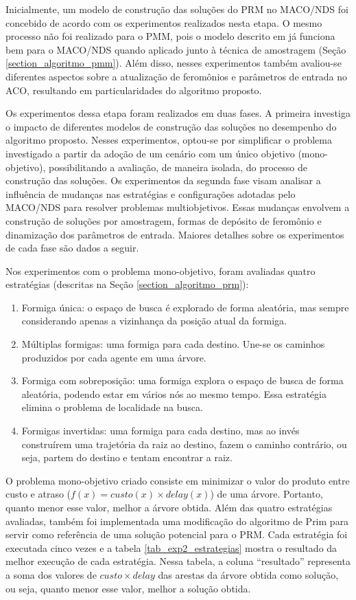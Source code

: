 Inicialmente, um modelo de construção das soluções do PRM no MACO/NDS foi concebido de acordo com os experimentos realizados nesta etapa. O mesmo processo não foi realizado para o PMM, pois o modelo descrito em \cite{Alaya2004} já funciona bem para o MACO/NDS quando aplicado junto à técnica de amostragem (Seção \ref{section_algoritmo_pmm}). Além disso, nesses experimentos também avaliou-se diferentes aspectos sobre a atualização de feromônios e parâmetros de entrada no ACO, resultando em particularidades do algoritmo proposto.

Os experimentos dessa etapa foram realizados em duas fases. A primeira investiga o impacto de diferentes modelos de construção das soluções no desempenho do algoritmo proposto. Nesses experimentos, optou-se por simplificar o problema investigado a partir da adoção de um cenário com um único objetivo (mono-objetivo), possibilitando a avaliação, de maneira isolada, do processo de construção das soluções. Os experimentos da segunda fase visam analisar a influência de mudanças nas estratégias e configurações adotadas pelo MACO/NDS para resolver problemas multiobjetivos. Essas mudanças envolvem a construção de soluções por amostragem, formas de depósito de feromônio e dinamização dos parâmetros de entrada. Maiores detalhes sobre os experimentos de cada fase são dados a seguir.

Nos experimentos com o problema mono-objetivo, foram avaliadas quatro estratégias (descritas na Seção \ref{section_algoritmo_prm}):

\begin{enumerate}
	\item Formiga única: o espaço de busca é explorado de forma aleatória, mas sempre considerando apenas a vizinhança da posição atual da formiga.
	\item Múltiplas formigas: uma formiga para cada destino. Une-se os caminhos produzidos por cada agente em uma árvore.
	\item Formiga com sobreposição: uma formiga explora o espaço de busca de forma aleatória, podendo estar em vários nós ao mesmo tempo. Essa estratégia elimina o problema de localidade na busca.
	\item Formigas invertidas: uma formiga para cada destino, mas ao invés construírem uma trajetória da raiz ao destino, fazem o caminho contrário, ou seja, partem do destino e tentam encontrar a raiz.
\end{enumerate}

O problema mono-objetivo criado consiste em minimizar o valor do produto entre custo e atraso ($f(x) = custo(x) \times delay(x)$) de uma árvore. Portanto, quanto menor esse valor, melhor a árvore obtida. Além das quatro estratégias avaliadas, também foi implementada uma modificação do algoritmo de Prim \cite{Prim1957} para servir como referência de uma solução potencial para o PRM. Cada estratégia foi executada cinco vezes e a tabela \ref{tab_exp2_estrategias} mostra o resultado da melhor execução de cada estratégia. Nessa tabela, a coluna ``resultado'' representa a soma dos valores de $custo \times delay$ das arestas da árvore obtida como solução, ou seja, quanto menor esse valor, melhor a solução obtida.

